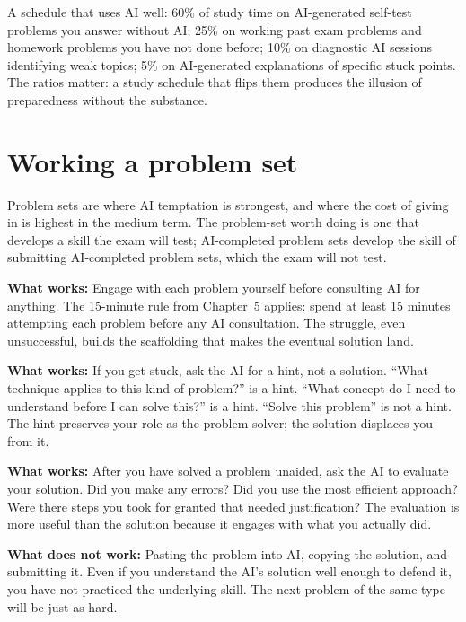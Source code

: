 \documentclass[11pt]{book}
\begin{document}
\begin{tryit}
A schedule that uses AI well: 60\% of study time on AI-generated self-test problems you answer without AI; 25\% on working past exam problems and homework problems you have not done before; 10\% on diagnostic AI sessions identifying weak topics; 5\% on AI-generated explanations of specific stuck points. The ratios matter: a study schedule that flips them produces the illusion of preparedness without the substance.
\end{tryit}

\section{Working a problem set}

Problem sets are where AI temptation is strongest, and where the cost of giving in is highest in the medium term. The problem-set worth doing is one that develops a skill the exam will test; AI-completed problem sets develop the skill of submitting AI-completed problem sets, which the exam will not test.

\textbf{What works:} Engage with each problem yourself before consulting AI for anything. The 15-minute rule from Chapter~5 applies: spend at least 15 minutes attempting each problem before any AI consultation. The struggle, even unsuccessful, builds the scaffolding that makes the eventual solution land.

\textbf{What works:} If you get stuck, ask the AI for a hint, not a solution. ``What technique applies to this kind of problem?'' is a hint. ``What concept do I need to understand before I can solve this?'' is a hint. ``Solve this problem'' is not a hint. The hint preserves your role as the problem-solver; the solution displaces you from it.

\textbf{What works:} After you have solved a problem unaided, ask the AI to evaluate your solution. Did you make any errors? Did you use the most efficient approach? Were there steps you took for granted that needed justification? The evaluation is more useful than the solution because it engages with what you actually did.

\textbf{What does not work:} Pasting the problem into AI, copying the solution, and submitting it. Even if you understand the AI's solution well enough to defend it, you have not practiced the underlying skill. The next problem of the same type will be just as hard.
\end{document}
